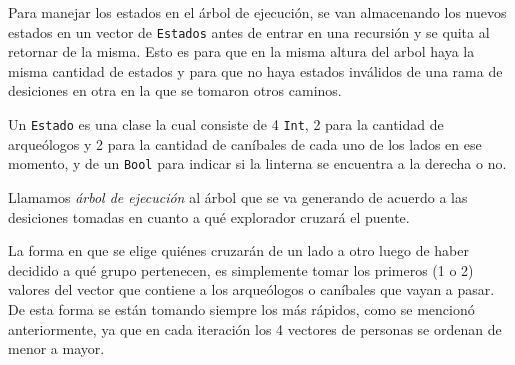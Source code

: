             Para manejar los estados en el árbol de ejecución, se van almacenando los nuevos estados en un vector de \texttt{Estados} antes de entrar en una recursión y se quita al retornar de la misma. Esto es para que en la misma altura del arbol haya la misma cantidad de estados y para que no haya estados inválidos de una rama de desiciones en otra en la que se tomaron otros caminos.

            Un \texttt{Estado} es una clase la cual consiste de 4 \texttt{Int}, 2 para la cantidad de arqueólogos y 2 para la cantidad de caníbales de cada uno de los lados en ese momento, y de un \texttt{Bool} para indicar si la linterna se encuentra a la derecha o no.

            Llamamos \emph{árbol de ejecución} al árbol que se va generando de acuerdo a las desiciones tomadas en cuanto a qué explorador cruzará el puente.

            La forma en que se elige quiénes cruzarán de un lado a otro luego de haber decidido a qué grupo pertenecen, es simplemente tomar los primeros (1 o 2) valores del vector que contiene a los arqueólogos o caníbales que vayan a pasar. De esta forma se están tomando siempre los más rápidos, como se mencionó anteriormente, ya que en cada iteración los 4 vectores de personas se ordenan de menor a mayor.

